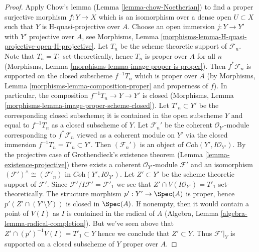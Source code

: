 \begin{proof}
\medskip\noindent
Apply Chow's lemma (Lemma \ref{lemma-chow-Noetherian}) to find a
proper surjective morphism $f : Y \to X$ which is an isomorphism
over a dense open $U \subset X$ such that $Y$ is H-quasi-projective
over $A$. Choose an open immersion $j : Y \to Y'$ with
$Y'$ projective over $A$, see
Morphisms, Lemma \ref{morphisms-lemma-H-quasi-projective-open-H-projective}.
Let $T_n$ be the scheme theoretic support of $\mathcal{F}_n$.
Note that $T_n = T_1$ set-theoretically, hence $T_n$ is
proper over $A$ for all $n$
(Morphisms, Lemma \ref{morphisms-lemma-image-proper-is-proper}).
Then $f^*\mathcal{F}_n$ is supported on the closed subscheme
$f^{-1}T_n$ which is proper over $A$ (by
Morphisms, Lemma \ref{morphisms-lemma-composition-proper}
and properness of $f$).
In particular, the composition $f^{-1}T_n \to Y \to Y'$ is closed
(Morphisms, Lemma \ref{morphisms-lemma-image-proper-scheme-closed}).
Let $T'_n \subset Y'$ be the corresponding closed subscheme;
it is contained in the open subscheme $Y$ and equal to $f^{-1}T_n$
as a closed subscheme of $Y$. Let $\mathcal{F}_n'$
be the coherent $\mathcal{O}_{Y'}$-module corresponding to
$f^*\mathcal{F}_n$ viewed as a coherent module on $Y'$ via
the closed immersion $f^{-1}T_n = T'_n \subset Y'$.
Then $(\mathcal{F}_n')$
is an object of $\textit{Coh}(Y', I\mathcal{O}_{Y'})$.
By the projective case of Grothendieck's existence theorem
(Lemma \ref{lemma-existence-projective})
there exists a coherent $\mathcal{O}_{Y'}$-module
$\mathcal{F}'$ and an isomorphism
$(\mathcal{F}')^\wedge \cong (\mathcal{F}'_n)$ in
$\textit{Coh}(Y', I\mathcal{O}_{Y'})$.
Let $Z' \subset Y'$ be the scheme theoretic support of $\mathcal{F}'$.
Since $\mathcal{F}'/I\mathcal{F}' = \mathcal{F}'_1$ we see
that $Z' \cap V(I\mathcal{O}_{Y'}) = T'_1$ set-theoretically.
The structure morphism $p' : Y' \to \Spec(A)$ is proper, hence
$p'(Z' \cap (Y' \setminus Y))$ is closed in $\Spec(A)$.
If nonempty, then it would contain a point of $V(I)$
as $I$ is contained in the radical of $A$
(Algebra, Lemma \ref{algebra-lemma-radical-completion}).
But we've seen above that $Z' \cap (p')^{-1}V(I) = T'_1 \subset Y$
hence we conclude that $Z' \subset Y$. Thus $\mathcal{F}'|_Y$
is supported on a closed subscheme of $Y$ proper over $A$.


\end{proof}

